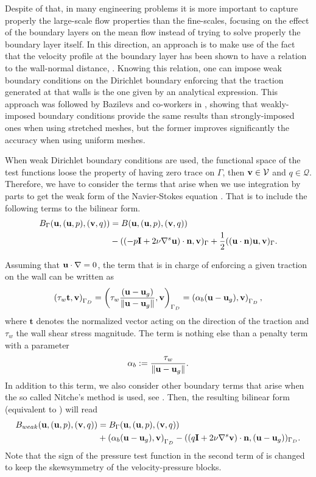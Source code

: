 Despite of that, in many engineering problems it is more important to capture properly the large-scale flow properties than the fine-scales, focusing on the effect of the boundary layers on the mean flow instead of trying to solve properly the boundary layer itself. In this direction, an approach is to make use of the fact that the velocity profile at the boundary layer has been shown to have a relation to the wall-normal distance, \cite{pope_turbulent_2000}. Knowing this relation, one can impose weak boundary conditions on the Dirichlet boundary enforcing that the traction generated at that walls is the one given by an analytical expression. This approach was followed by Bazilevs and co-workers in \cite{bazilevs_weak_2007}, showing that weakly-imposed boundary conditions provide the same results than strongly-imposed ones when using stretched meshes, but the former improves significantly the accuracy when using uniform meshes. 

When weak Dirichlet boundary conditions are used, the functional space of the test functions loose the property of having zero trace on $\Gamma$, then ${\bf v}\in\mathcal{V}$ and $q\in\mathcal{Q}$. Therefore, we have to consider the terms that arise when we use integration by parts to get the weak form of the Navier-Stokes equation . That is to include the following terms to the bilinear form.
\begin{align}
\label{eq-C7_bilinear_boundary}
B_\Gamma({\bf u},({\bf u},p),({\bf v},q))&=B({\bf u},({\bf u},p),({\bf v},q))\\\nonumber
&-((-p\mathbf{I}+2\nu\nabla^s{\bf u})\cdot{\bf n},{\bf v})_\Gamma+\frac{1}{2}(({\bf u}\cdot{\bf n}){\bf u},{\bf v})_\Gamma.
\end{align}

Assuming that $ {\bf u}\cdot\nabla=0 $, the term that is in charge of enforcing a given traction on the wall can be written as
\begin{equation}
\label{eq-C7_wall_term}
\left(\tau_w\mathbf{t},{\bf v}\right)_{\Gamma_D}=\left(\tau_w\frac{({\bf u}-{\bf u}_g)}{\|{\bf u}-{\bf u}_g\|},{\bf v}\right)_{\Gamma_D}=\left(\alpha_b({\bf u}-{\bf u}_g),{\bf v}\right)_{\Gamma_D},
\end{equation}
where $ \mathbf{t} $ denotes the normalized vector acting on the direction of the traction and $ \tau_w $ the wall shear stress magnitude. The term  is nothing else than a penalty term with a parameter \begin{equation}
\label{eq-C7_alpha_b}
\alpha_b:=\frac{\tau_w}{\|{\bf u}-{\bf u}_g\|}.
\end{equation}
In addition to this term, we also consider other boundary terms that arise when the so called Nitche's method is used, see \cite{nitsche_uber_1971,stenberg_techniques_1995}. Then, the resulting bilinear form (equivalent to ) will read
\begin{align}
\label{eq-C7_bilinear_weak}
B_{weak}({\bf u},({\bf u},p),({\bf v},q))&=B_\Gamma({\bf u},({\bf u},p),({\bf v},q))\\\nonumber
&+\left(\alpha_b({\bf u}-{\bf u}_g),{\bf v}\right)_{\Gamma_D}-((q\mathbf{I}+2\nu\nabla^s{\bf v})\cdot{\bf n},({\bf u}-{\bf u}_g))_{\Gamma_D}.
\end{align}
Note that the sign of the pressure test function in the second term of  is changed to keep the skewsymmetry of the velocity-pressure blocks. 

